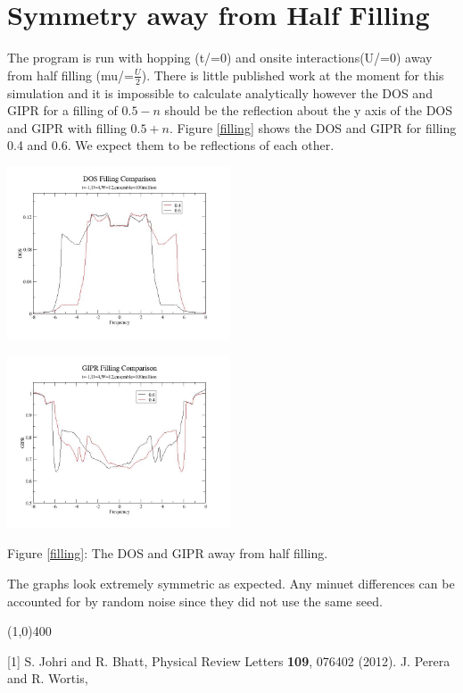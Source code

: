 \documentclass{article}
\begin{document}
\section{Symmetry away from Half Filling}
The program is run with hopping (t/=0) and onsite interactions(U/=0) away from half filling (mu/=$\frac{U}{2}$). There is little published work at the moment for this simulation and it is impossible to calculate analytically however the DOS and GIPR for a filling of $0.5-n$ should be the reflection about the y axis of the DOS and GIPR with filling $0.5+n$. Figure \ref{filling} shows the DOS and GIPR for filling 0.4 and 0.6. We expect them to be reflections of each other.
\begin{multicols}{2}
\begin{center}
	\includegraphics[width=250px]{dos_comparef.jpg} \\ \label{filling}
\end{center}
\begin{center}
	\includegraphics[width=250px]{gipr_comparef.jpg} \\
\end{center}
\end{multicols}
\begin{center}
Figure \ref{filling}: The DOS and GIPR away from half filling. 
\end{center}
The graphs look extremely symmetric as expected. Any minuet differences can be accounted for by random noise since they did not use the same seed. 
\begin{center}
	\line(1,0){400}
\end{center}
[1] S. Johri and R. Bhatt, Physical Review Letters \textbf{109}, 076402 (2012). \newline
[2] J. Perera and R. Wortis,
\end{document}
